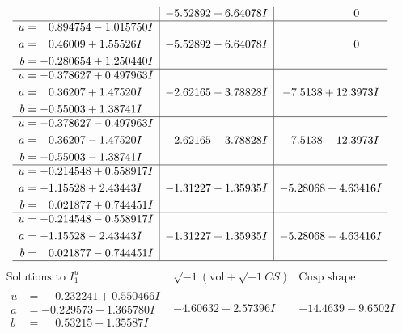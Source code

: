 \documentclass[1p]{elsarticle_modified}
\theoremstyle{definition}
\newcommand{\I}{\sqrt{-1}}
\begin{document}
$$\begin{array}{c|c|c}
 & -5.52892 + 6.64078 I & \phantom{-0.000000 } 0 \\ \hline\begin{aligned}
u &= \phantom{-}0.894754 - 1.015750 I \\
a &= \phantom{-}0.46009 + 1.55526 I \\
b &= -0.280654 + 1.250440 I\end{aligned}
 & -5.52892 - 6.64078 I & \phantom{-0.000000 } 0 \\ \hline\begin{aligned}
u &= -0.378627 + 0.497963 I \\
a &= \phantom{-}0.36207 + 1.47520 I \\
b &= -0.55003 + 1.38741 I\end{aligned}
 & -2.62165 - 3.78828 I & -7.5138 + 12.3973 I \\ \hline\begin{aligned}
u &= -0.378627 - 0.497963 I \\
a &= \phantom{-}0.36207 - 1.47520 I \\
b &= -0.55003 - 1.38741 I\end{aligned}
 & -2.62165 + 3.78828 I & -7.5138 - 12.3973 I \\ \hline\begin{aligned}
u &= -0.214548 + 0.558917 I \\
a &= -1.15528 + 2.43443 I \\
b &= \phantom{-}0.021877 + 0.744451 I\end{aligned}
 & -1.31227 - 1.35935 I & -5.28068 + 4.63416 I \\ \hline\begin{aligned}
u &= -0.214548 - 0.558917 I \\
a &= -1.15528 - 2.43443 I \\
b &= \phantom{-}0.021877 - 0.744451 I\end{aligned}
 & -1.31227 + 1.35935 I & -5.28068 - 4.63416 I\\
 \hline 
 \end{array}$$\newpage$$\begin{array}{c|c|c}  
\text{Solutions to }I^u_{1}& \I (\text{vol} + \sqrt{-1}CS) & \text{Cusp shape}\\
 \hline 
\begin{aligned}
u &= \phantom{-}0.232241 + 0.550466 I \\
a &= -0.229573 - 1.365780 I \\
b &= \phantom{-}0.53215 - 1.35587 I\end{aligned}
 & -4.60632 + 2.57396 I & -14.4639 - 9.6502 I \\ \hline\begin{aligned}

\end{aligned}
\end{array}$$
\end{document}
